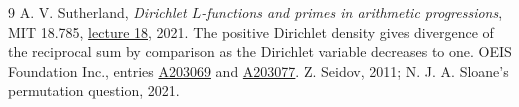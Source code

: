 \documentclass[11pt,letterpaper]{article}
\newcommand{\oeis}[1]{\href{https://oeis.org/A#1}{A#1}}
\begin{document}
\begin{thebibliography}{9}
 A. V. Sutherland, \emph{Dirichlet $L$-functions and primes in arithmetic progressions}, MIT 18.785, \href{https://ocw.mit.edu/courses/18-785-number-theory-i-fall-2021/mit18_785f21_lec18.pdf}{lecture 18}, 2021. The positive Dirichlet density gives divergence of the reciprocal sum by comparison as the Dirichlet variable decreases to one.
 OEIS Foundation Inc., entries \oeis{203069} and \oeis{203077}. Z. Seidov, 2011; N. J. A. Sloane's permutation question, 2021.
\end{thebibliography}
\end{document}
